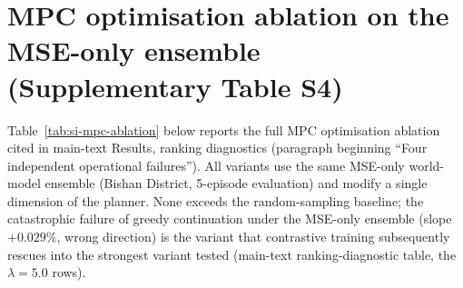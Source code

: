 \documentclass[11pt]{article}
\begin{document}
\section{MPC optimisation ablation on the MSE-only ensemble (Supplementary Table S4)}\label{si:s2-mpc-ablation}

Table~\ref{tab:si-mpc-ablation} below reports the full MPC optimisation ablation cited in main-text Results, ranking diagnostics (paragraph beginning ``Four independent operational failures''). All variants use the same MSE-only world-model ensemble (Bishan District, 5-episode evaluation) and modify a single dimension of the planner. None exceeds the random-sampling baseline; the catastrophic failure of greedy continuation under the MSE-only ensemble (slope $+0.029\%$, wrong direction) is the variant that contrastive training subsequently rescues into the strongest variant tested (main-text ranking-diagnostic table, the $\lambda{=}5.0$ rows).

\begin{table}[htbp]
\centering
\small
\caption{MPC optimisation ablation across four dimensions, on the MSE-only world-model ensemble (Bishan District). All variants start from the optimal $H{=}5$, $K{=}50$ random-reward configuration and modify one dimension. None exceeds the random-sampling baseline; aggressive exploitation (greedy continuation) actively reverses the slope direction. The diagnostic shows that the failure is structural to the learned model rather than to the search procedure.}
\label{tab:si-mpc-ablation}
\end{table}
\end{document}

